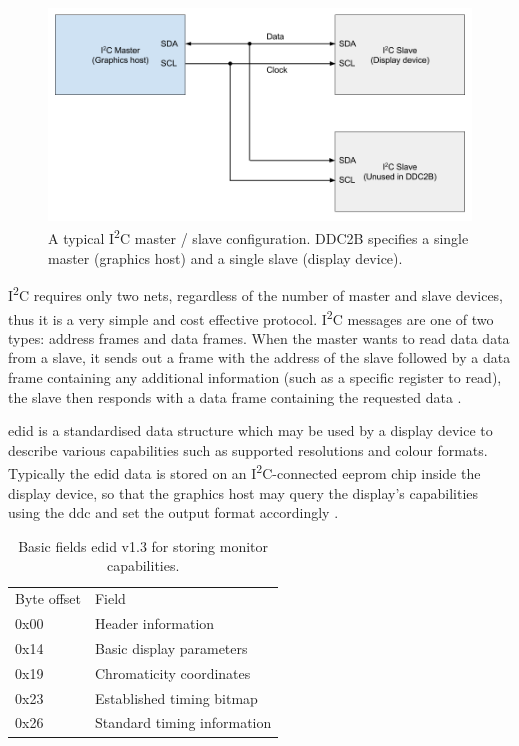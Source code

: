 \begin{figure}
  \centering
  \includegraphics[width=1\textwidth]{./img/i2c_bus.png}
  \caption{A typical I\textsuperscript{2}C master / slave configuration. DDC2B specifies a single master (graphics host) and a single slave (display device).}
  \label{fig:i2c_bus}
\end{figure}

I\textsuperscript{2}C requires only two nets, regardless of the number of master and slave devices, thus it is a very simple and cost effective protocol. I\textsuperscript{2}C messages are one of two types: address frames and data frames. When the master wants to read data data from a slave, it sends out a frame with the address of the slave followed by a data frame containing any additional information (such as a specific register to read), the slave then responds with a data frame containing the requested data \cite{dvi_spec}.

\gls{edid} is a standardised data structure which may be used by a display device to describe various capabilities such as supported resolutions and colour formats. Typically the \gls{edid} data is stored on an I\textsuperscript{2}C-connected \gls{eeprom} chip inside the display device, so that the graphics host may query the display's capabilities using the \gls{ddc} and set the output format accordingly \cite{edid_spec}.

\begin{table}
    \begin{tabular}{ll}
    Byte offset & Field                       \\
    0x00        & Header information          \\
    0x14        & Basic display parameters    \\
    0x19        & Chromaticity coordinates    \\
    0x23        & Established timing bitmap   \\
    0x26        & Standard timing information \\
    \end{tabular}
    \caption{Basic fields \gls{edid} v1.3 for storing monitor capabilities.}
    \label{table:basic_edid_fields}
\end{table}

